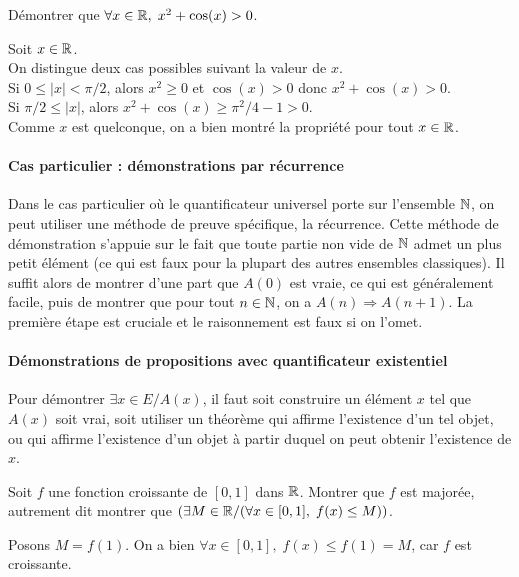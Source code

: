 {\begin{exemple}
Démontrer que $\forall x\in\mathbb{R},\; x^2+\cos(x)>0$.
\end{exemple}
\begin{red}
Soit $x\in\mathbb{R}$.\\
On distingue deux cas possibles suivant la valeur de $x$.\\
Si $0\leq |x|< \pi/2$, alors $x^2\geq 0$ et $\cos(x)> 0$ donc $x^2+\cos(x)>0$.\\
Si  $\pi/2\leq|x|$, alors $x^2+\cos(x)\geq \pi^2/4-1>0$.\\
Comme $x$ est quelconque, on a bien montré la propriété pour tout $x\in\mathbb{R}$.\end{red}

\paragraph{Cas particulier : démonstrations par récurrence}
Dans le cas particulier où le quantificateur universel porte sur l'ensemble $\mathbb{N}$, on peut utiliser une méthode de preuve spécifique, la récurrence. Cette méthode de démonstration s'appuie sur le fait que toute partie non vide de $\mathbb{N}$ admet un plus petit élément (ce qui est faux pour la plupart des autres ensembles classiques). Il suffit alors de montrer d'une part que $A(0)$ est vraie, ce qui est généralement facile, puis de montrer que pour tout $n \in\mathbb{N}$, on a $A(n) \Rightarrow A(n+1)$. La première étape est cruciale et le raisonnement est faux si on l'omet.


\paragraph{Démonstrations de propositions avec quantificateur existentiel}$ $\\

Pour démontrer \og$\exists x\in E\slash A(x)$, il faut soit construire un élément $x$ tel que $A(x)$ soit vrai, soit utiliser un théorème qui affirme l'existence d'un tel objet, ou qui affirme l'existence d'un objet à partir duquel on peut obtenir l'existence de $x$.

\begin{exemple}
Soit $f$ une fonction croissante de $[0,1]$ dans $\mathbb{R}$. Montrer que $f$ est majorée, autrement dit montrer que $(\exists M\in\mathbb{R}\slash (\forall x\in[0,1],\;f(x)\leq M))$.
\begin{red}
Posons $M = f(1)$. On a bien $\forall x\in[0,1],\;f(x)\leq f(1)= M$, car $f$ est croissante.
\end{red}
\end{exemple}

}
